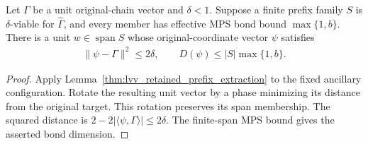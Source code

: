 \begin{lemma}
    \label{thm:lvv_padding_prefix_mps}
    \leanok
    Let $\Gamma$ be a unit original-chain vector and $\delta<1$.
    Suppose a finite prefix family $S$ is $\delta$-viable for
    $\widehat\Gamma$, and every member has effective MPS bond bound
    $\max\{1,b\}$. There is a unit $w\in\operatorname{span}S$ whose
    original-coordinate vector $\psi$ satisfies
    \begin{align*}
        \|\psi-\Gamma\|^2\le2\delta,
        \qquad D(\psi)\le |S|\max\{1,b\}.
    \end{align*}
\end{lemma}
\begin{proof}
    \leanok
    Apply Lemma~\ref{thm:lvv_retained_prefix_extraction} to the fixed
    ancillary configuration. Rotate the resulting unit vector by a phase
    minimizing its distance from the original target. This rotation preserves
    its span membership. The squared distance is
    $2-2|\langle\psi,\Gamma\rangle|\le2\delta$.
    The finite-span MPS bound gives the asserted bond dimension.
\end{proof}


